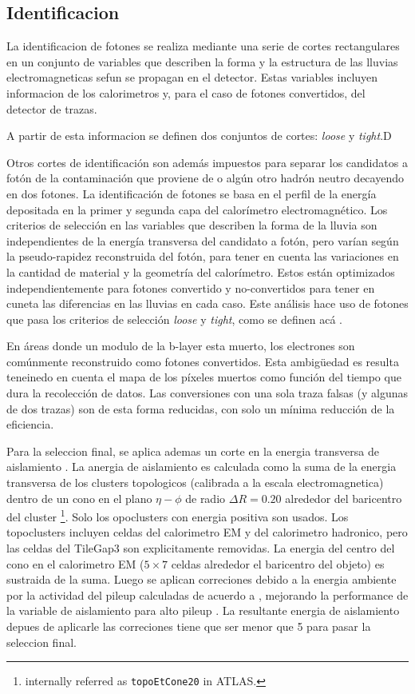 \subsection{Identificacion}

La identificacion de fotones se realiza mediante una serie de cortes
rectangulares en un conjunto de variables que describen la forma
y la estructura de las lluvias electromagneticas sefun se propagan en
el detector. Estas variables incluyen informacion de los calorimetros y,
para el caso de fotones convertidos, del detector de trazas.

A partir de esta informacion se definen dos conjuntos de cortes: \emph{loose} y
\emph{tight}.D


Otros cortes de identificación son además impuestos para separar los
candidatos a fotón de la contaminación que proviene de {\pizero} o
algún otro hadrón neutro decayendo en dos fotones. La identificación
de fotones se basa en el perfil de la energía depositada en la primer
y segunda capa del calorímetro electromagnético\cite{ATL-PHYS-PUB-2011-007}.
Los criterios de selección en las variables que describen la forma de
la lluvia son independientes de la energía transversa del candidato a
fotón, pero varían según la pseudo-rapidez reconstruida del fotón, para
tener en cuenta las variaciones en la cantidad de material y la geometría
del calorímetro. Estos están optimizados independientemente para fotones
convertido y no-convertidos para tener en cuneta las diferencias en las
lluvias en cada caso. Este análisis hace uso de fotones que pasa los
criterios de selección \emph{loose} y \emph{tight}, como se definen acá
\cite{ATL-PHYS-PUB-2011-007}.

En áreas donde un modulo de la b-layer esta muerto, los electrones son
comúnmente reconstruido como fotones convertidos. Esta ambigüedad
es resulta teneinedo en cuenta el mapa de los píxeles muertos como
función del tiempo que dura la recolección de datos. Las conversiones
con una sola traza falsas (y algunas de dos trazas) son de esta forma
reducidas, con solo un mínima reducción de la eficiencia.

Para la seleccion final, se aplica ademas un corte en la energia
transversa de aislamiento {\etiso}. La anergia de aislamiento
es calculada como la suma de la energia transversa de los clusters
topologicos (calibrada a la escala electromagnetica) dentro de un
cono en el plano $\eta-\phi$ de radio $\Delta R = 0.20$ alrededor
del baricentro del cluster \footnote{internally referred as
  \texttt{topoEtCone20} in ATLAS.}.
Solo los opoclusters con energia positiva son usados. Los topoclusters
incluyen celdas del calorimetro EM y del calorimetro hadronico, pero
las celdas del TileGap3 son explicitamente removidas.
La energia del centro del cono en el calorimetro EM ($5\times7$ celdas alrededor el
baricentro del objeto) es sustraida de la suma. Luego se aplican correciones
debido a la energia ambiente por la actividad del pileup calculadas de acuerdo
a \cite{Hance:1379530}, mejorando la performance de la variable de aislamiento
para alto pileup \cite{Laplace:1444890}. La resultante energia de aislamiento
depues de aplicarle las correciones tiene que ser menor que 5 {\gev} para
pasar la seleccion final.


